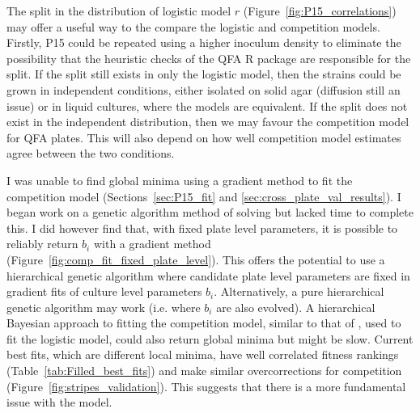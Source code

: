 The split in the distribution of logistic model \(r\)
(Figure~\ref{fig:P15_correlations}) may offer a useful way to the
compare the logistic and competition models. Firstly, P15 could be
repeated using a higher inoculum density to eliminate the possibility
that the heuristic checks of the QFA R package are responsible for the
split. If the split still exists in only the logistic model, then the
strains could be grown in independent conditions, either isolated on
solid agar (diffusion still an issue) or in liquid cultures, where the
models are equivalent. If the split does not exist in the independent
distribution, then we may favour the competition model for QFA
plates. This will also depend on how well competition model estimates
agree between the two conditions.


I was unable to find global minima using a gradient method to fit the
competition model (Sections~\ref{sec:P15_fit} and
\ref{sec:cross_plate_val_results}). I began work on a genetic
algorithm method of solving but lacked time to complete this. I did
however find that, with fixed plate level parameters, it is possible
to reliably return \(b_{i}\) with a gradient method
(Figure~\ref{fig:comp_fit_fixed_plate_level}). This offers the
potential to use a hierarchical genetic algorithm where candidate
plate level parameters are fixed in gradient fits of culture level
parameters \(b_{i}\). Alternatively, a pure hierarchical genetic
algorithm may work (i.e. where \(b_{i}\) are also evolved). A
hierarchical Bayesian approach to fitting the competition model,
similar to that of \citet{Heydari2016}, used to fit the logistic
model, could also return global minima but might be slow. Current best
fits, which are different local minima, have well correlated fitness
rankings (Table~\ref{tab:Filled_best_fits}) and make similar
overcorrections for competition
(Figure~\ref{fig:stripes_validation}). This suggests that there is a
more fundamental issue with the model.

